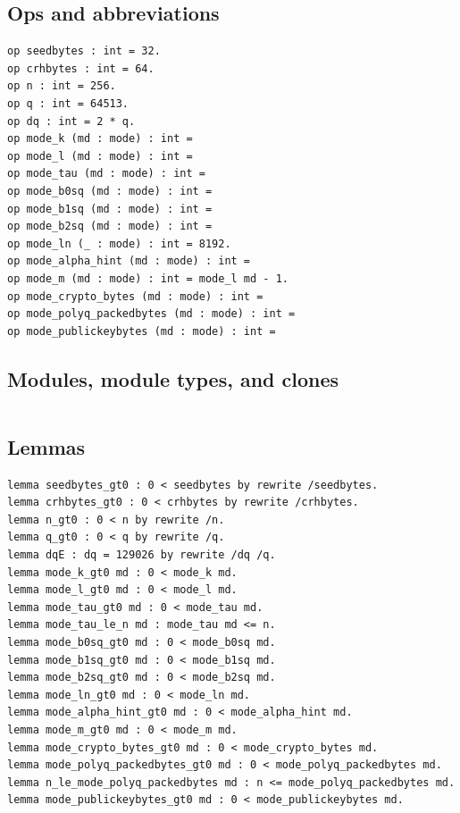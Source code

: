 \subsection*{Ops and abbreviations}
\begin{lstlisting}[language=EasyCrypt,basicstyle=\ttfamily\tiny]
op seedbytes : int = 32.
op crhbytes : int = 64.
op n : int = 256.
op q : int = 64513.
op dq : int = 2 * q.
op mode_k (md : mode) : int =
op mode_l (md : mode) : int =
op mode_tau (md : mode) : int =
op mode_b0sq (md : mode) : int =
op mode_b1sq (md : mode) : int =
op mode_b2sq (md : mode) : int =
op mode_ln (_ : mode) : int = 8192.
op mode_alpha_hint (md : mode) : int =
op mode_m (md : mode) : int = mode_l md - 1.
op mode_crypto_bytes (md : mode) : int =
op mode_polyq_packedbytes (md : mode) : int =
op mode_publickeybytes (md : mode) : int =
\end{lstlisting}

\subsection*{Modules, module types, and clones}
\begin{lstlisting}[language=EasyCrypt,basicstyle=\ttfamily\tiny]
\end{lstlisting}

\subsection*{Lemmas}
\begin{lstlisting}[language=EasyCrypt,basicstyle=\ttfamily\tiny]
lemma seedbytes_gt0 : 0 < seedbytes by rewrite /seedbytes.
lemma crhbytes_gt0 : 0 < crhbytes by rewrite /crhbytes.
lemma n_gt0 : 0 < n by rewrite /n.
lemma q_gt0 : 0 < q by rewrite /q.
lemma dqE : dq = 129026 by rewrite /dq /q.
lemma mode_k_gt0 md : 0 < mode_k md.
lemma mode_l_gt0 md : 0 < mode_l md.
lemma mode_tau_gt0 md : 0 < mode_tau md.
lemma mode_tau_le_n md : mode_tau md <= n.
lemma mode_b0sq_gt0 md : 0 < mode_b0sq md.
lemma mode_b1sq_gt0 md : 0 < mode_b1sq md.
lemma mode_b2sq_gt0 md : 0 < mode_b2sq md.
lemma mode_ln_gt0 md : 0 < mode_ln md.
lemma mode_alpha_hint_gt0 md : 0 < mode_alpha_hint md.
lemma mode_m_gt0 md : 0 < mode_m md.
lemma mode_crypto_bytes_gt0 md : 0 < mode_crypto_bytes md.
lemma mode_polyq_packedbytes_gt0 md : 0 < mode_polyq_packedbytes md.
lemma n_le_mode_polyq_packedbytes md : n <= mode_polyq_packedbytes md.
lemma mode_publickeybytes_gt0 md : 0 < mode_publickeybytes md.
\end{lstlisting}

